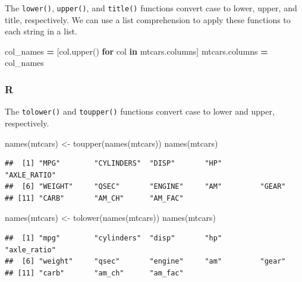 \documentclass[
]{book}
\newenvironment{Shaded}{\begin{snugshade}}{\end{snugshade}}
\newcommand{\ControlFlowTok}[1]{\textcolor[rgb]{0.13,0.29,0.53}{\textbf{#1}}}
\newcommand{\FunctionTok}[1]{\textcolor[rgb]{0.00,0.00,0.00}{#1}}
\newcommand{\KeywordTok}[1]{\textcolor[rgb]{0.13,0.29,0.53}{\textbf{#1}}}
\newcommand{\NormalTok}[1]{#1}
\newcommand{\OperatorTok}[1]{\textcolor[rgb]{0.81,0.36,0.00}{\textbf{#1}}}
\newcommand{\OtherTok}[1]{\textcolor[rgb]{0.56,0.35,0.01}{#1}}
\begin{document}
The \texttt{lower()}, \texttt{upper()}, and \texttt{title()} functions convert case to lower, upper, and title, respectively. We can use a list comprehension to apply these functions to each string in a list.

\begin{Shaded}
\begin{Highlighting}[]
\NormalTok{col\_names }\OperatorTok{=}\NormalTok{ [col.upper() }\ControlFlowTok{for}\NormalTok{ col }\KeywordTok{in}\NormalTok{ mtcars.columns]}
\NormalTok{mtcars.columns }\OperatorTok{=}\NormalTok{ col\_names}
\end{Highlighting}
\end{Shaded}

\hypertarget{r-26}{%
\subsubsection*{R}\label{r-26}}

The \texttt{tolower()} and \texttt{toupper()} functions convert case to lower and upper, respectively.

\begin{Shaded}
\begin{Highlighting}[]
\FunctionTok{names}\NormalTok{(mtcars) }\OtherTok{\textless{}{-}} \FunctionTok{toupper}\NormalTok{(}\FunctionTok{names}\NormalTok{(mtcars))}
\FunctionTok{names}\NormalTok{(mtcars)}
\end{Highlighting}
\end{Shaded}

\begin{verbatim}
##  [1] "MPG"        "CYLINDERS"  "DISP"       "HP"         "AXLE_RATIO"
##  [6] "WEIGHT"     "QSEC"       "ENGINE"     "AM"         "GEAR"      
## [11] "CARB"       "AM_CH"      "AM_FAC"
\end{verbatim}

\begin{Shaded}
\begin{Highlighting}[]
\FunctionTok{names}\NormalTok{(mtcars) }\OtherTok{\textless{}{-}} \FunctionTok{tolower}\NormalTok{(}\FunctionTok{names}\NormalTok{(mtcars))}
\FunctionTok{names}\NormalTok{(mtcars)}
\end{Highlighting}
\end{Shaded}

\begin{verbatim}
##  [1] "mpg"        "cylinders"  "disp"       "hp"         "axle_ratio"
##  [6] "weight"     "qsec"       "engine"     "am"         "gear"      
## [11] "carb"       "am_ch"      "am_fac"
\end{verbatim}
\end{document}
